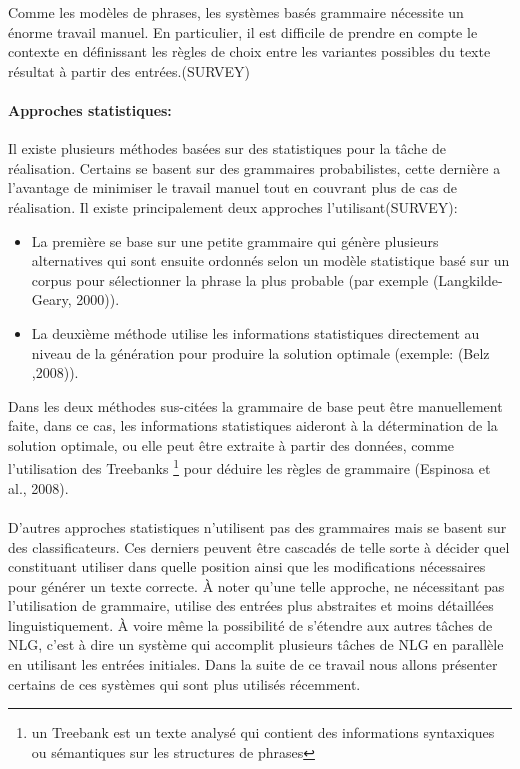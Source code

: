 Comme les modèles de phrases, les systèmes basés grammaire nécessite un énorme travail manuel. En particulier, il est difficile de prendre en compte le contexte en définissant les règles de choix entre les variantes possibles du texte résultat à partir des entrées.(SURVEY)

\paragraph{Approches statistiques:} Il existe plusieurs méthodes basées sur des statistiques pour la tâche de réalisation. Certains se basent sur des grammaires probabilistes, cette dernière a l’avantage de minimiser le travail manuel tout en couvrant plus de cas de réalisation. Il existe principalement deux approches l’utilisant(SURVEY):
\begin{itemize}
	\item La première se base sur une petite grammaire qui génère plusieurs alternatives qui sont ensuite ordonnés selon un modèle statistique basé sur un corpus pour sélectionner la phrase la plus probable (par exemple (Langkilde-Geary, 2000)).
	\item La deuxième méthode utilise les informations statistiques directement au niveau de la génération pour produire la solution optimale (exemple: (Belz ,2008)).
\end{itemize}
	Dans les deux méthodes sus-citées la grammaire de base peut être manuellement faite, dans ce cas, les informations statistiques aideront à la détermination de la solution optimale, ou elle peut être extraite à partir des données, comme l’utilisation des Treebanks \footnote{un Treebank est un texte analysé qui contient des informations syntaxiques ou sémantiques sur les structures de phrases} pour déduire les règles de grammaire (Espinosa et al., 2008).\newline
\paragraph{}
D’autres approches statistiques n’utilisent pas des grammaires mais se basent sur des classificateurs. Ces derniers peuvent être cascadés de telle sorte à décider quel constituant utiliser dans quelle position ainsi que les modifications nécessaires pour générer un texte correcte. À noter qu’une telle approche, ne nécessitant pas l’utilisation de grammaire, utilise des entrées plus abstraites et moins détaillées linguistiquement. À voire même la possibilité de s’étendre aux autres tâches de NLG, c’est à dire un système qui accomplit plusieurs tâches de NLG en parallèle en utilisant les entrées initiales. Dans la suite de ce travail nous allons présenter certains de ces systèmes qui sont plus utilisés récemment.

